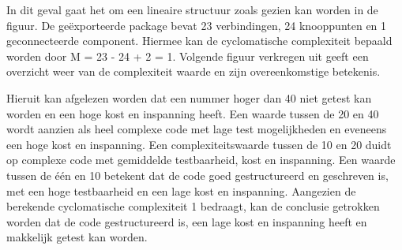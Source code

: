 In dit geval gaat het om een lineaire structuur zoals gezien kan worden in de figuur. De geëxporteerde package bevat 23 verbindingen, 24 knooppunten en 1 geconnecteerde component. Hiermee kan de cyclomatische complexiteit bepaald worden door M = 23 - 24 + 2 = 1. Volgende figuur verkregen uit \textcite{complexitynumbers} geeft een overzicht weer van de complexiteit waarde en zijn overeenkomstige betekenis. 

Hieruit kan afgelezen worden dat een nummer hoger dan 40 niet getest kan worden en een hoge kost en inspanning heeft. Een waarde tussen de 20 en 40 wordt aanzien als heel complexe code met lage test mogelijkheden en eveneens een hoge kost en inspanning. Een complexiteitswaarde tussen de 10 en 20 duidt op complexe code met gemiddelde testbaarheid, kost en inspanning. Een waarde tussen de één en 10 betekent dat de code goed gestructureerd en geschreven is, met een hoge testbaarheid en een lage kost en inspanning. Aangezien de berekende cyclomatische complexiteit 1 bedraagt, kan de conclusie getrokken worden dat de code gestructureerd is, een lage kost en inspanning heeft en makkelijk getest kan worden.


